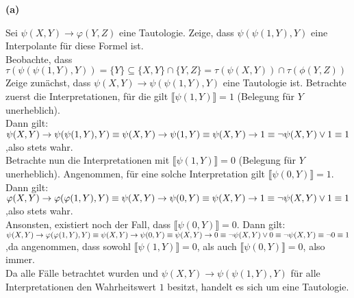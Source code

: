\documentclass[11pt, a4paper]{article}
\begin{document}
\textbf{(a)}
\begin{adjustwidth}{20pt}{20pt}
Sei $\psi(X,Y) \rightarrow \varphi(Y,Z)$ eine Tautologie. Zeige, dass $\psi(\psi(1,Y),Y)$ eine Interpolante für diese Formel ist.\\

Beobachte, dass $\tau(\psi(\psi(1,Y),Y))=\{Y\} \subseteq \{X,Y\}\cap \{Y,Z\} = \tau(\psi(X,Y))\cap \tau(\phi(Y,Z))$\\

Zeige zunächst, dass $\psi(X,Y) \rightarrow \psi(\psi(1,Y),Y)$ eine Tautologie ist. Betrachte zuerst die Interpretationen, für die gilt $\llbracket \psi(1,Y) \rrbracket=1$ (Belegung für $Y$ unerheblich).\\

Dann gilt:\\
 $\psi(X,Y) \rightarrow \psi(\psi(1,Y),Y)\\ \equiv \psi(X,Y) \rightarrow \psi(1,Y)\\ \equiv \psi(X,Y) \rightarrow 1 \equiv \neg \psi(X,Y) \vee 1 \equiv 1$ \qquad ,also stets wahr.\\
 
 Betrachte nun die Interpretationen mit $\llbracket \psi(1,Y) \rrbracket=0$ (Belegung für $Y$ unerheblich). Angenommen, für eine solche Interpretation gilt $\llbracket \psi(0,Y) \rrbracket=1$. Dann gilt:\\
 $\varphi(X,Y) \rightarrow \varphi(\varphi(1,Y),Y)\\ \equiv \psi(X,Y) \rightarrow \psi(0,Y)\\ \equiv \psi(X,Y) \rightarrow 1 \equiv \neg \psi(X,Y) \vee 1 \equiv 1$ \qquad ,also stets wahr.\\
 
 Ansonsten, existiert noch der Fall, dass $\llbracket \psi(0,Y) \rrbracket=0$. Dann gilt:\\
 
$\psi(X,Y) \rightarrow \varphi(\varphi(1,Y),Y)\\ \equiv \psi(X,Y) \rightarrow \psi(0,Y)\\ \equiv \psi(X,Y) \rightarrow 0 \equiv \neg \psi(X,Y) \vee 0 \equiv \neg \psi(X,Y) \equiv \neg 0 \equiv 1$ \qquad ,da angenommen, dass sowohl $\llbracket \psi(1,Y) \rrbracket=0$, als auch $\llbracket \psi(0,Y) \rrbracket=0$, also immer.\\

Da alle Fälle betrachtet wurden und $\psi(X,Y) \rightarrow \psi(\psi(1,Y),Y)$ für alle Interpretationen den Wahrheitswert $1$ besitzt, handelt es sich um eine Tautologie.\\


\end{adjustwidth}
\end{document}
